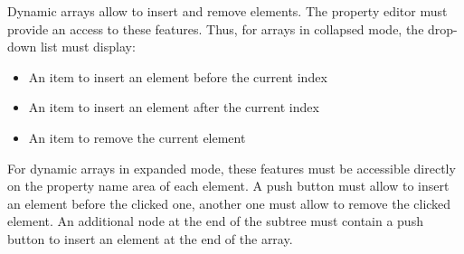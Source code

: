 \documentclass[a4paper, twoside]{report}
\begin{document}
Dynamic arrays allow to insert and remove elements. The property editor must provide an access to
these features. Thus, for arrays in collapsed mode, the drop-down list must display:
\begin{itemize}
    \item An item to insert an element before the current index
    \item An item to insert an element after the current index
    \item An item to remove the current element
\end{itemize}

For dynamic arrays in expanded mode, these features must be accessible directly on the property name
area of each element. A push button must allow to insert an element before the clicked one, another
one must allow to remove the clicked element. An additional node at the end of the subtree must contain a push button to insert an element at the end of the array.
\end{document}
